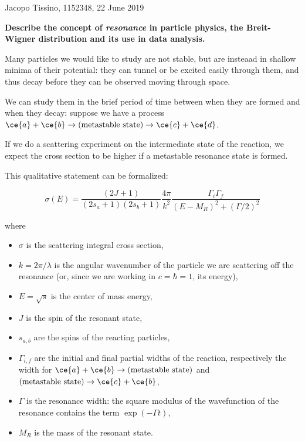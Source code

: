 \documentclass{article}
\begin{document}

{\centering Jacopo Tissino, 1152348, 22 June 2019}

\textbf{Describe the concept of \emph{resonance} in particle physics, the Breit-Wigner distribution and its use in data analysis.}

Many particles we would like to study are not stable, but are insteaad in shallow
minima of their potential: they can tunnel or be excited easily through them, and
thus decay before they can be observed moving through space.

We can study them in the brief period of time between when they are formed and when
they decay: suppose we have a process \(\ce{a} + \ce{b} \rightarrow \text{(metastable state)} \rightarrow \ce{c} + \ce{d} \).

If we do a scattering experiment on the intermediate state of the reaction, we expect the cross section to be higher if a metastable resonance state is formed.

This qualitative statement can be formalized:

\begin{equation}
    \sigma(E)  =
    \frac{(2J+1)}{(2s_a + 1) (2s_b + 1)} \frac{4 \pi }{k^2}
    \frac{\Gamma_i \Gamma_f}{(E-M_R)^2 + (\Gamma/2)^2}
\end{equation}

where

\begin{itemize}
    \item \(\sigma\) is the scattering integral cross section,
    \item \(k = 2 \pi / \lambda\) is the angular wavenumber of the particle we are scattering off the resonance (or, since we are working in \(c=\hbar=1\), its energy),
    \item \(E = \sqrt{s} \) is the center of mass energy,
    \item \(J\) is the spin of the resonant state,
    \item \(s_{a, b}\) are the spins of the reacting particles,
    \item \(\Gamma_{i,f}\) are the initial and final partial widths of the reaction, respectively the width for \(\ce{a} + \ce{b} \rightarrow \text{(metastable state)}\) and \(\text{(metastable state)} \rightarrow \ce{c} + \ce{b} \),
    \item \(\Gamma\) is the resonance width: the square modulus of the wavefunction of the resonance contains the term \(\exp(- \Gamma t) \),
    \item \(M_R\) is the mass of the resonant state.
\end{itemize}
\end{document}

